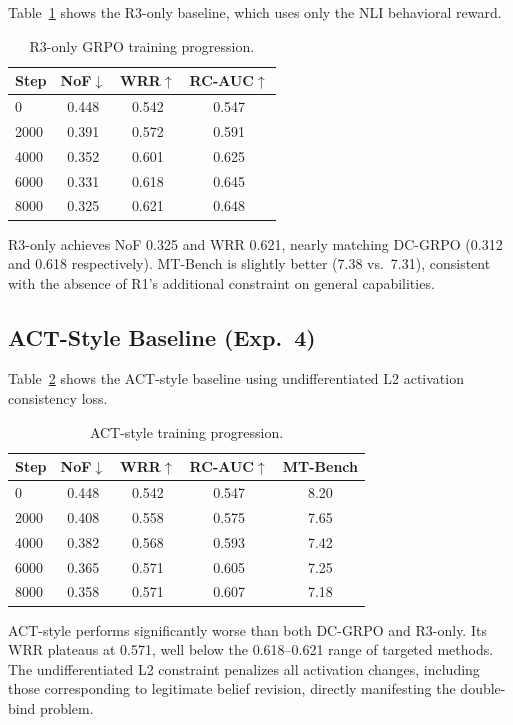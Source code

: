 \documentclass[11pt,a4paper]{article}
\begin{document}
Table~\ref{tab:r3only_prog} shows the R3-only baseline, which uses only the NLI behavioral reward.

\begin{table}[h]
\centering
\small
\caption{R3-only GRPO training progression.}
\label{tab:r3only_prog}
\begin{tabular}{lccc}
\toprule
Step & NoF$\downarrow$ & WRR$\uparrow$ & RC-AUC$\uparrow$ \\
\midrule
0    & 0.448 & 0.542 & 0.547 \\
2000 & 0.391 & 0.572 & 0.591 \\
4000 & 0.352 & 0.601 & 0.625 \\
6000 & 0.331 & 0.618 & 0.645 \\
8000 & 0.325 & 0.621 & 0.648 \\
\bottomrule
\end{tabular}
\end{table}

R3-only achieves NoF 0.325 and WRR 0.621, nearly matching DC-GRPO (0.312 and 0.618 respectively). MT-Bench is slightly better (7.38 vs.\ 7.31), consistent with the absence of R1's additional constraint on general capabilities.

\subsection{ACT-Style Baseline (Exp.\ 4)}

Table~\ref{tab:act_prog} shows the ACT-style baseline using undifferentiated L2 activation consistency loss.

\begin{table}[h]
\centering
\small
\caption{ACT-style training progression.}
\label{tab:act_prog}
\begin{tabular}{lcccc}
\toprule
Step & NoF$\downarrow$ & WRR$\uparrow$ & RC-AUC$\uparrow$ & MT-Bench \\
\midrule
0    & 0.448 & 0.542 & 0.547 & 8.20 \\
2000 & 0.408 & 0.558 & 0.575 & 7.65 \\
4000 & 0.382 & 0.568 & 0.593 & 7.42 \\
6000 & 0.365 & 0.571 & 0.605 & 7.25 \\
8000 & 0.358 & 0.571 & 0.607 & 7.18 \\
\bottomrule
\end{tabular}
\end{table}

ACT-style performs significantly worse than both DC-GRPO and R3-only. Its WRR plateaus at 0.571, well below the 0.618--0.621 range of targeted methods. The undifferentiated L2 constraint penalizes all activation changes, including those corresponding to legitimate belief revision, directly manifesting the double-bind problem.
\end{document}
